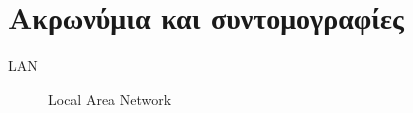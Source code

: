 \chapter{Ακρωνύμια και συντομογραφίες}

\begin{description}
  \item[LAN] Local Area Network
\end{description}
